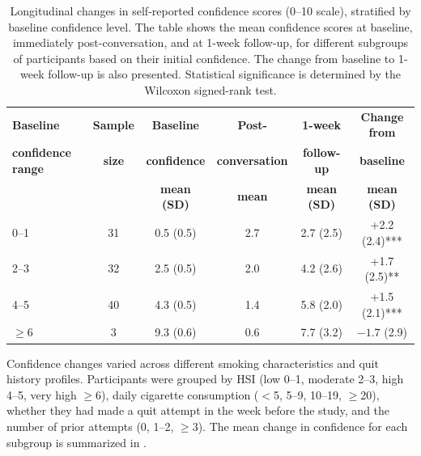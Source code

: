 \begin{table}[ht!]
	\centering
	\small
	\renewcommand{\arraystretch}{1.1}
	\begin{tabular*}{\linewidth}{@{\extracolsep{\fill}}lccccc@{}}
		\toprule
		\textbf{Baseline} & \textbf{Sample} & \textbf{Baseline} & \textbf{Post-} & \textbf{1-week} & \textbf{Change from} \\
		\textbf{confidence range} & \textbf{size} & \textbf{confidence} & \textbf{conversation} & \textbf{follow-up} & \textbf{baseline} \\
		& & \textbf{mean (SD)} & \textbf{mean} & \textbf{mean (SD)} & \textbf{mean (SD)} \\
		\midrule
		0--1   & 31 & 0.5 (0.5) & 2.7 & 2.7 (2.5) & +2.2 (2.4)*** \\
		2--3   & 32 & 2.5 (0.5) & 2.0 & 4.2 (2.6) & +1.7 (2.5)** \\
		4--5   & 40 & 4.3 (0.5) & 1.4 & 5.8 (2.0) & +1.5 (2.1)*** \\
		$\geq$6 & 3 & 9.3 (0.6) & 0.6 & 7.7 (3.2) & $-1.7$ (2.9) \\
		\bottomrule
	\end{tabular*}
	\caption[Confidence Changes by Baseline Confidence]{Longitudinal changes in self-reported confidence scores (0--10 scale), stratified by baseline confidence level. The table shows the mean confidence scores at baseline, immediately post-conversation, and at 1-week follow-up, for different subgroups of participants based on their initial confidence. The change from baseline to 1-week follow-up is also presented. Statistical significance is determined by the Wilcoxon signed-rank test.}
	\label{tab:baseline_confidence}
\end{table}




Confidence changes varied across different smoking characteristics and quit history profiles. Participants were grouped by HSI (low 0--1, moderate 2--3, high 4--5, very high $\geq$6), daily cigarette consumption ($<$5, 5--9, 10--19, $\geq$20), whether they had made a quit attempt in the week before the study, and the number of prior attempts (0, 1--2, $\geq$3). The mean change in confidence for each subgroup is summarized in .

